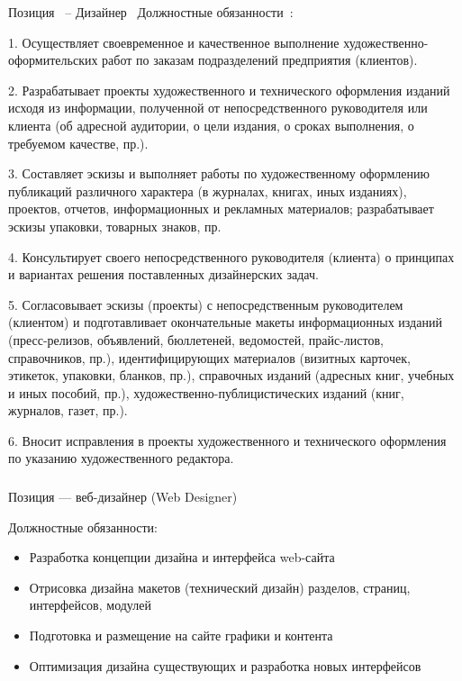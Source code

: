 \documentclass{../industrial-development}
\begin{document}
\lecturenotes

Позиция~\cite{hh} – Дизайнер~\cite{itcf}
Должностные обязанности~\cite{rab}:

1.	Осуществляет своевременное и качественное выполнение художественно-оформительских работ по заказам подразделений предприятия (клиентов).

2.	Разрабатывает проекты художественного и технического оформления изданий исходя из информации, полученной от непосредственного руководителя или клиента (об адресной аудитории, о цели издания, о сроках выполнения, о требуемом качестве, пр.).

3.	Составляет эскизы и выполняет работы по художественному оформлению публикаций различного характера (в журналах, книгах, иных изданиях), проектов, отчетов, информационных и рекламных материалов; разрабатывает эскизы упаковки, товарных знаков, пр.

4.	Консультирует своего непосредственного руководителя (клиента) о принципах и вариантах решения поставленных дизайнерских задач.

5.	Согласовывает эскизы (проекты) с непосредственным руководителем (клиентом) и подготавливает окончательные макеты информационных изданий (пресс-релизов, объявлений, бюллетеней, ведомостей, прайс-листов, справочников, пр.), идентифицирующих материалов (визитных карточек, этикеток, упаковки, бланков, пр.), справочных изданий (адресных книг, учебных и иных пособий, пр.), художественно-публицистических изданий (книг, журналов, газет, пр.).

6.	Вносит исправления в проекты художественного и технического оформления по указанию художественного редактора.

\begin{frame} \frametitle{}
 \begin{block}{}
  \alert{Позиция --- веб-дизайнер (Web Designer)}

Должностные обязанности: 
  \end{block}
  \begin{itemize}
  \item   Разработка концепции дизайна и интерфейса web-сайта
  \item  Отрисовка дизайна макетов (технический дизайн) разделов, страниц, интерфейсов, модулей
  \item Подготовка и размещение на сайте графики и контента
 \item Оптимизация дизайна существующих и разработка новых интерфейсов
  \end{itemize}
\end{frame}
\end{document}
